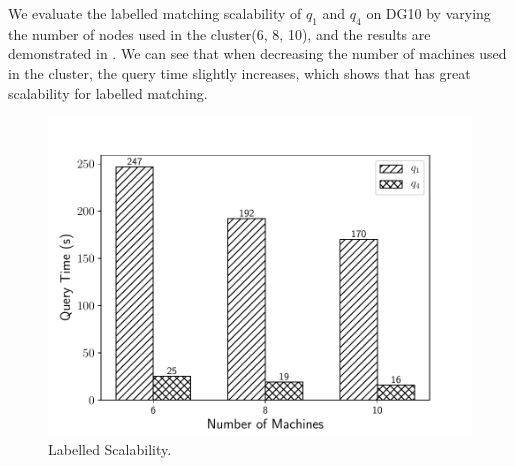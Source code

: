  We evaluate the labelled matching scalability of $q_1$ and $q_4$ on DG10 by varying the number of nodes used in the cluster(6, 8, 10), and the results are demonstrated in . We can see that when decreasing the number of machines used in the cluster, the query time slightly increases, which shows that \gencliqjoin has great scalability for labelled matching.

\begin{figure}[htb]
  \centering
  \includegraphics[scale=0.4]{figures/exp5.pdf}
  \caption{\small{Labelled Scalability.}}
  \label{fig:l_sca}
\end{figure}
